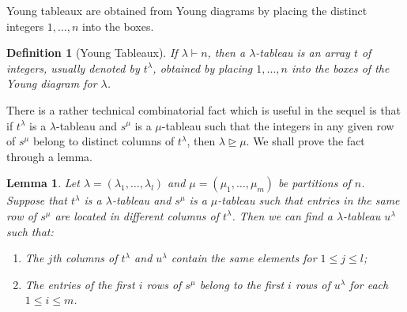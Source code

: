 \documentclass{assignment}[2019/10/15]
\theoremstyle{plain}
\newtheorem{definition}[theorem]{Definition}
\newtheorem{lemma}[theorem]{Lemma}
\begin{document}
    Young tableaux are obtained from Young diagrams by placing the distinct integers $1, \dotsc, n$ into the boxes.

    \begin{definition}[Young Tableaux]
        If $\lambda\vdash n$, then a $\lambda$-\emph{tableau} is an array $t$ of integers, usually denoted by $t^\lambda$, obtained by placing $1, \dotsc, n$ into the boxes of the Young diagram for $\lambda$.
    \end{definition}

    There is a rather technical combinatorial fact which is useful in the sequel is that if $t^\lambda$ is a $\lambda$-tableau and $s^\mu$ is a $\mu$-tableau such that the integers in any given row of $s^\mu$ belong to distinct columns of $t^\lambda$, then $\lambda\unrhd\mu$. We shall prove the fact through a lemma.

    \begin{lemma}\label{lem: tableaux}
        Let $\lambda = (\lambda_1, \dotsc, \lambda_l)$ and $\mu = (\mu_1, \dotsc, \mu_m)$ be partitions of $n$. Suppose that $t^\lambda$ is a $\lambda$-tableau and $s^\mu$ is a $\mu$-tableau such that entries in the same row of $s^\mu$ are located in different columns of $t^\lambda$. Then we can find a $\lambda$-tableau $u^\lambda$ such that:
        \begin{enumerate}
            \item The $j$th columns of $t^\lambda$ and $u^\lambda$ contain the same elements for $1\leq j \leq l$;
            \item The entries of the first $i$ rows of $s^\mu$ belong to the first $i$ rows of $u^\lambda$ for each $1\leq i \leq m$.
        \end{enumerate}
    \end{lemma}
\end{document}
